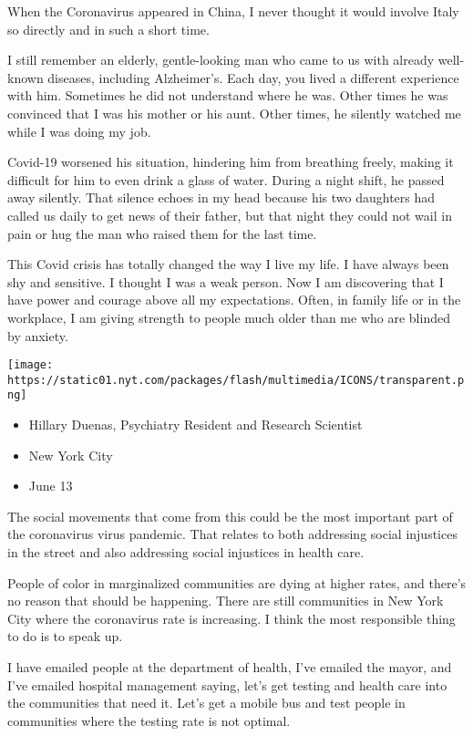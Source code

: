 When the Coronavirus appeared in China, I never thought it would involve
Italy so directly and in such a short time.

I still remember an elderly, gentle-looking man who came to us with
already well-known diseases, including Alzheimer's. Each day, you lived
a different experience with him. Sometimes he did not understand where
he was. Other times he was convinced that I was his mother or his aunt.
Other times, he silently watched me while I was doing my job.

Covid-19 worsened his situation, hindering him from breathing freely,
making it difficult for him to even drink a glass of water. During a
night shift, he passed away silently. That silence echoes in my head
because his two daughters had called us daily to get news of their
father, but that night they could not wail in pain or hug the man who
raised them for the last time.

This Covid crisis has totally changed the way I live my life. I have
always been shy and sensitive. I thought I was a weak person. Now I am
discovering that I have power and courage above all my expectations.
Often, in family life or in the workplace, I am giving strength to
people much older than me who are blinded by anxiety.

\texttt{[image: https://static01.nyt.com/packages/flash/multimedia/ICONS/transparent.png]}

\begin{itemize}
\tightlist
\item
  Hillary Duenas, Psychiatry Resident and Research Scientist
\item
  New York City
\item
  June 13
\end{itemize}

The social movements that come from this could be the most important
part of the coronavirus virus pandemic. That relates to both addressing
social injustices in the street and also addressing social injustices in
health care.

People of color in marginalized communities are dying at higher rates,
and there's no reason that should be happening. There are still
communities in New York City where the coronavirus rate is increasing. I
think the most responsible thing to do is to speak up.

I have emailed people at the department of health, I've emailed the
mayor, and I've emailed hospital management saying, let's get testing
and health care into the communities that need it. Let's get a mobile
bus and test people in communities where the testing rate is not
optimal.

